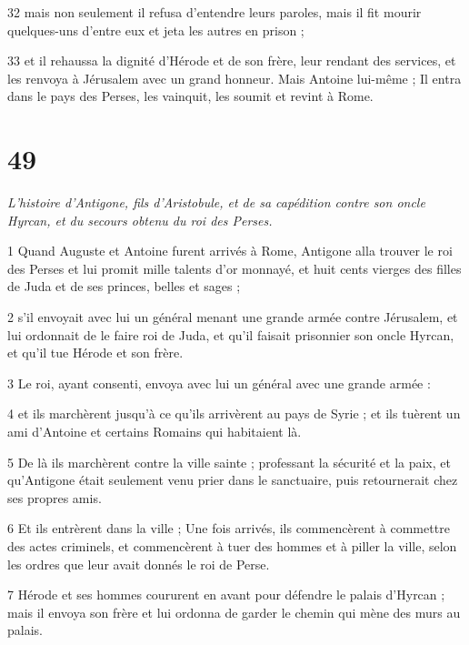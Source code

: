 \par 32 mais non seulement il refusa d'entendre leurs paroles, mais il fit mourir quelques-uns d'entre eux et jeta les autres en prison ;

\par 33 et il rehaussa la dignité d'Hérode et de son frère, leur rendant des services, et les renvoya à Jérusalem avec un grand honneur. Mais Antoine lui-même ; Il entra dans le pays des Perses, les vainquit, les soumit et revint à Rome.

\chapter{49}

\par \textit{L'histoire d'Antigone, fils d'Aristobule, et de sa capédition contre son oncle Hyrcan, et du secours obtenu du roi des Perses.}

\par 1 Quand Auguste et Antoine furent arrivés à Rome, Antigone alla trouver le roi des Perses et lui promit mille talents d'or monnayé, et huit cents vierges des filles de Juda et de ses princes, belles et sages ;

\par 2 s'il envoyait avec lui un général menant une grande armée contre Jérusalem, et lui ordonnait de le faire roi de Juda, et qu'il faisait prisonnier son oncle Hyrcan, et qu'il tue Hérode et son frère.

\par 3 Le roi, ayant consenti, envoya avec lui un général avec une grande armée :

\par 4 et ils marchèrent jusqu'à ce qu'ils arrivèrent au pays de Syrie ; et ils tuèrent un ami d'Antoine et certains Romains qui habitaient là.

\par 5 De là ils marchèrent contre la ville sainte ; professant la sécurité et la paix, et qu'Antigone était seulement venu prier dans le sanctuaire, puis retournerait chez ses propres amis.

\par 6 Et ils entrèrent dans la ville ; Une fois arrivés, ils commencèrent à commettre des actes criminels, et commencèrent à tuer des hommes et à piller la ville, selon les ordres que leur avait donnés le roi de Perse.

\par 7 Hérode et ses hommes coururent en avant pour défendre le palais d'Hyrcan ; mais il envoya son frère et lui ordonna de garder le chemin qui mène des murs au palais.

